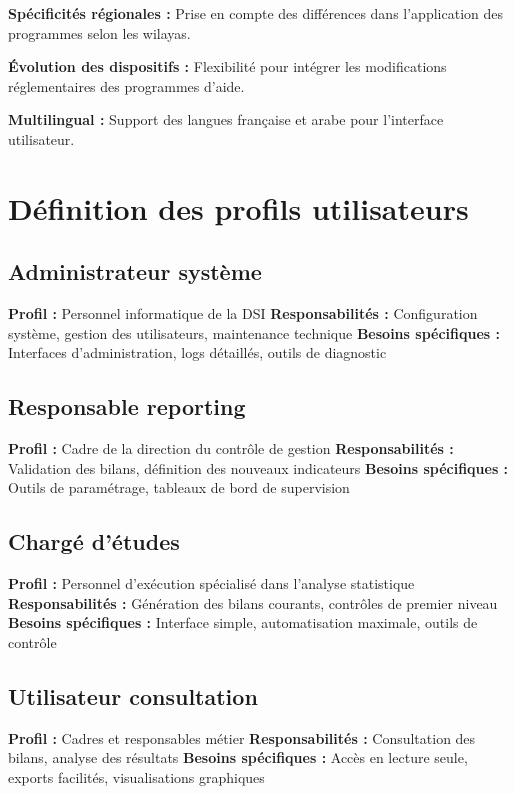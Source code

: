 \textbf{Spécificités régionales :} Prise en compte des différences dans l'application des programmes selon les wilayas.

\textbf{Évolution des dispositifs :} Flexibilité pour intégrer les modifications réglementaires des programmes d'aide.

\textbf{Multilingual :} Support des langues française et arabe pour l'interface utilisateur.

\section{Définition des profils utilisateurs}

\subsection{Administrateur système}

\textbf{Profil :} Personnel informatique de la DSI
\textbf{Responsabilités :} Configuration système, gestion des utilisateurs, maintenance technique
\textbf{Besoins spécifiques :} Interfaces d'administration, logs détaillés, outils de diagnostic

\subsection{Responsable reporting}

\textbf{Profil :} Cadre de la direction du contrôle de gestion
\textbf{Responsabilités :} Validation des bilans, définition des nouveaux indicateurs
\textbf{Besoins spécifiques :} Outils de paramétrage, tableaux de bord de supervision

\subsection{Chargé d'études}

\textbf{Profil :} Personnel d'exécution spécialisé dans l'analyse statistique
\textbf{Responsabilités :} Génération des bilans courants, contrôles de premier niveau
\textbf{Besoins spécifiques :} Interface simple, automatisation maximale, outils de contrôle

\subsection{Utilisateur consultation}

\textbf{Profil :} Cadres et responsables métier
\textbf{Responsabilités :} Consultation des bilans, analyse des résultats
\textbf{Besoins spécifiques :} Accès en lecture seule, exports facilités, visualisations graphiques

